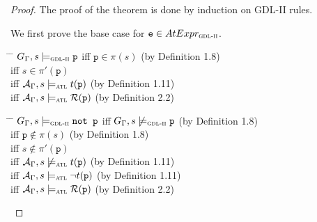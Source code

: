 \documentclass{article}
\theoremstyle{theorem}
\theoremstyle{lemma}
\theoremstyle{definition}
\theoremstyle{remark}
\begin{document}
\begin{proof}
    The proof of the theorem is done by induction on GDL-II rules.
    \par We first prove the base case for $\texttt{e} \in AtExpr_\textsc{gdl-ii}$.
    \begin{tabbing}
    \hspace{1.2cm} \= \hspace{2.5cm} \= \kill
    \> $G_\Gamma,s \models_\textsc{gdl-ii} \texttt{p}$ \> iff $\texttt{p} \in \pi(s)$ (by Definition 1.8) \\
    \>\> iff $s \in \pi'(\texttt{p})$ \\
    \>\> iff $\mathcal{A}_\Gamma,s \models_\textsc{atl} t(\texttt{p})$ (by Definition 1.11) \\
    \>\> iff $\mathcal{A}_\Gamma,s \models_\textsc{atl} \mathcal{R}(\texttt{p})$ (by Definition 2.2)
    \end{tabbing}
    \begin{tabbing}
    \hspace{1.2cm} \= \hspace{3.2cm} \= \kill
    \> $G_\Gamma,s \models_\textsc{gdl-ii} \texttt{not p}$ \> iff $G_\Gamma,s \not \models_\textsc{gdl-ii} \texttt{p}$ (by Definition 1.8) \\
    \>\> iff $\texttt{p} \not\in \pi(s)$ (by Definition 1.8) \\
    \>\> iff $s \not\in \pi'(\texttt{p})$ \\
    \>\> iff $\mathcal{A}_\Gamma,s \not\models_\textsc{atl} t(\texttt{p})$ (by Definition 1.11) \\
    \>\> iff $\mathcal{A}_\Gamma,s \models_\textsc{atl} \neg t(\texttt{p})$ (by Definition 1.11) \\
    \>\> iff $\mathcal{A}_\Gamma,s \models_\textsc{atl} \mathcal{R}(\texttt{p})$ (by Definition 2.2)
    \end{tabbing}

\end{proof}
\end{document}
